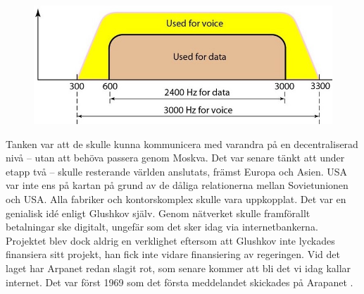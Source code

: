 \documentclass[a4paper,11pt]{article}
\begin{document}
\begin{figure}
  \centering
  \includegraphics[width=1.0\linewidth]{Bilder/bandbredd.jpg}
\end{figure}

Tanken var att de skulle kunna kommunicera med varandra på en decentraliserad
nivå -- utan att behöva passera genom Moskva. Det var senare tänkt att under
etapp två -- skulle resterande världen anslutats, främst Europa och Asien. USA
var inte ens på kartan på grund av de dåliga relationerna mellan Sovietunionen
och USA. Alla fabriker och kontorskomplex skulle vara uppkopplat. Det var en
genialisk idé enligt Glushkov själv. Genom nätverket skulle framförallt
betalningar ske digitalt, ungefär som det sker idag via internetbankerna.
Projektet blev dock aldrig en verklighet eftersom att Glushkov inte lyckades
finansiera sitt projekt, han fick inte vidare finansiering av regeringen. Vid
det laget har Arpanet redan slagit rot, som senare kommer att bli det vi idag
kallar internet. Det var först 1969 som det första meddelandet skickades på
Arapanet \cite{Wikipedia}.
\end{document}
